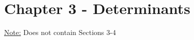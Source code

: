 \documentclass[11 pt, twoside]{article}
\newenvironment{outline*}
{
	\begin{outline}[enumerate]
	}
	{\end{outline}
}
\begin{document}
\section{Chapter 3 - Determinants}
\underline{Note:} Does not contain Sections 3-4
\end{document}

